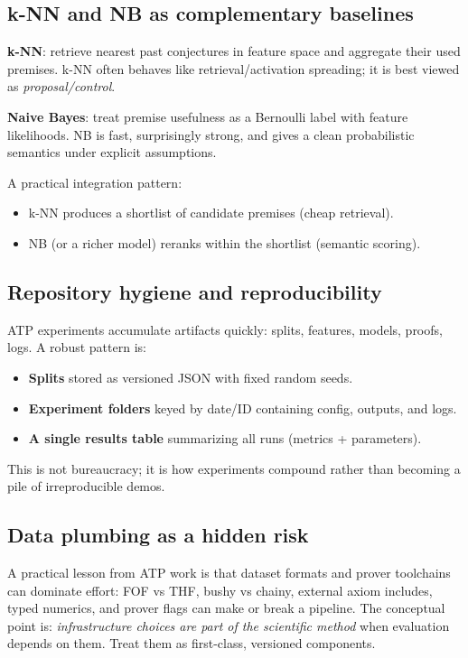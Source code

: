 \documentclass[11pt]{article}
\begin{document}
\subsection{k-NN and NB as complementary baselines}

\textbf{k-NN}:
retrieve nearest past conjectures in feature space and aggregate their used premises.
k-NN often behaves like retrieval/activation spreading; it is best viewed as \emph{proposal/control}.

\textbf{Naive Bayes}:
treat premise usefulness as a Bernoulli label with feature likelihoods.
NB is fast, surprisingly strong, and gives a clean probabilistic semantics under explicit assumptions.

A practical integration pattern:
\begin{itemize}[leftmargin=2em]
\item k-NN produces a shortlist of candidate premises (cheap retrieval).
\item NB (or a richer model) reranks within the shortlist (semantic scoring).
\end{itemize}

\subsection{Repository hygiene and reproducibility}

ATP experiments accumulate artifacts quickly: splits, features, models, proofs, logs.
A robust pattern is:
\begin{itemize}[leftmargin=2em]
\item \textbf{Splits} stored as versioned JSON with fixed random seeds.
\item \textbf{Experiment folders} keyed by date/ID containing config, outputs, and logs.
\item \textbf{A single results table} summarizing all runs (metrics + parameters).
\end{itemize}

This is not bureaucracy; it is how experiments compound rather than becoming a pile of irreproducible demos.

\subsection{Data plumbing as a hidden risk}

A practical lesson from ATP work is that dataset formats and prover toolchains can dominate effort:
FOF vs THF, bushy vs chainy, external axiom includes, typed numerics, and prover flags can make or break a pipeline.
The conceptual point is: \emph{infrastructure choices are part of the scientific method} when evaluation depends on them.
Treat them as first-class, versioned components.
\end{document}
